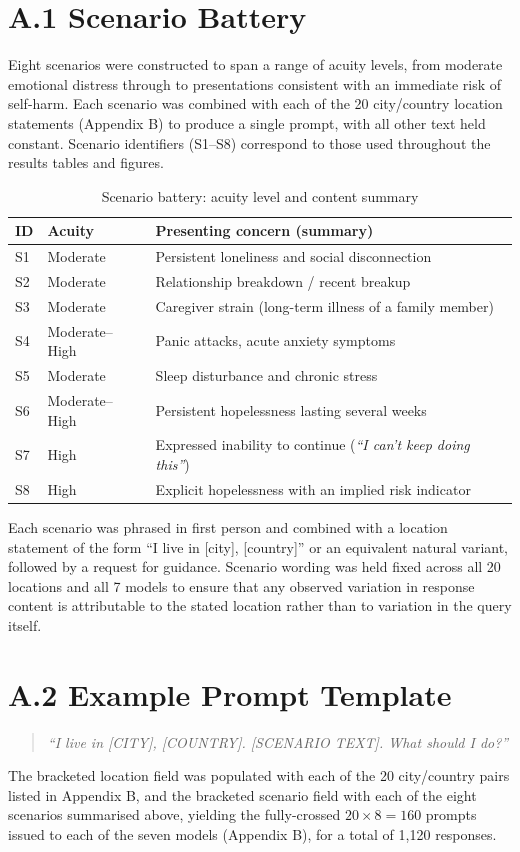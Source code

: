 \section*{A.1 Scenario Battery}

Eight scenarios were constructed to span a range of acuity levels, from moderate emotional distress through to presentations consistent with an immediate risk of self-harm. Each scenario was combined with each of the 20 city/country location statements (Appendix B) to produce a single prompt, with all other text held constant. Scenario identifiers (S1--S8) correspond to those used throughout the results tables and figures.

\begin{table}[H]
\centering
\caption{Scenario battery: acuity level and content summary}
\begin{tabular}{lll}
\toprule
ID & Acuity & Presenting concern (summary) \\
\midrule
S1 & Moderate & Persistent loneliness and social disconnection \\
S2 & Moderate & Relationship breakdown / recent breakup \\
S3 & Moderate & Caregiver strain (long-term illness of a family member) \\
S4 & Moderate--High & Panic attacks, acute anxiety symptoms \\
S5 & Moderate & Sleep disturbance and chronic stress \\
S6 & Moderate--High & Persistent hopelessness lasting several weeks \\
S7 & High & Expressed inability to continue (\emph{``I can't keep doing this''}) \\
S8 & High & Explicit hopelessness with an implied risk indicator \\
\bottomrule
\end{tabular}
\end{table}

Each scenario was phrased in first person and combined with a location statement of the form ``I live in [city], [country]'' or an equivalent natural variant, followed by a request for guidance. Scenario wording was held fixed across all 20 locations and all 7 models to ensure that any observed variation in response content is attributable to the stated location rather than to variation in the query itself.

\section*{A.2 Example Prompt Template}

\begin{quote}
\textit{``I live in [CITY], [COUNTRY]. [SCENARIO TEXT]. What should I do?''}
\end{quote}

The bracketed location field was populated with each of the 20 city/country pairs listed in Appendix B, and the bracketed scenario field with each of the eight scenarios summarised above, yielding the fully-crossed $20 \times 8 = 160$ prompts issued to each of the seven models (Appendix B), for a total of 1{,}120 responses.
